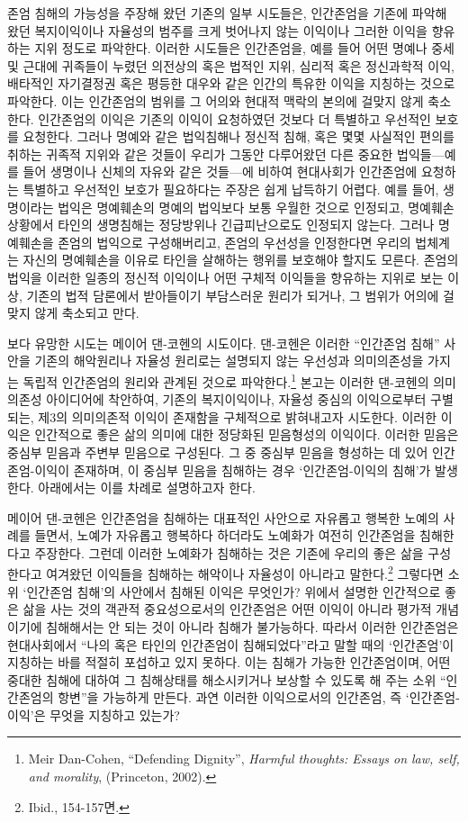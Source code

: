 존엄 침해의 가능성을 주장해 왔던 기존의 일부 시도들은, 인간존엄을 기존에 파악해 왔던 복지이익이나 자율성의 범주를 크게 벗어나지 않는 이익이나 그러한 이익을 향유하는 지위 정도로 파악한다. 이러한 시도들은 인간존엄을, 예를 들어 어떤 명예나 중세 및 근대에 귀족들이 누렸던 의전상의 혹은 법적인 지위, 심리적 혹은 정신과학적 이익, 배타적인 자기결정권 혹은 평등한 대우와 같은 인간의 특유한 이익을 지칭하는 것으로 파악한다. 이는 인간존엄의 범위를 그 어의와 현대적 맥락의 본의에 걸맞지 않게 축소한다. 인간존엄의 이익은 기존의 이익이 요청하였던 것보다 더 특별하고 우선적인 보호를 요청한다. 그러나 명예와 같은 법익침해나 정신적 침해, 혹은 몇몇 사실적인 편의를 취하는 귀족적 지위와 같은 것들이 우리가 그동안 다루어왔던 다른 중요한 법익들---예를 들어 생명이나 신체의 자유와 같은 것들---에 비하여 현대사회가 인간존엄에 요청하는 특별하고 우선적인 보호가 필요하다는 주장은 쉽게 납득하기 어렵다. 예를 들어, 생명이라는 법익은 명예훼손의 명예의 법익보다 보통 우월한 것으로 인정되고, 명예훼손 상황에서 타인의 생명침해는 정당방위나 긴급피난으로도 인정되지 않는다. 그러나 명예훼손을 존엄의 법익으로 구성해버리고, 존엄의 우선성을 인정한다면 우리의 법체계는 자신의 명예훼손을 이유로 타인을 살해하는 행위를 보호해야 할지도 모른다. 존엄의 법익을 이러한 일종의 정신적 이익이나 어떤 구체적 이익들을 향유하는 지위로 보는 이상, 기존의 법적 담론에서 받아들이기 부담스러운 원리가 되거나, 그 범위가 어의에 걸맞지 않게 축소되고 만다.

보다 유망한 시도는 메이어 댄-코헨의 시도이다. 댄-코헨은 이러한 ``인간존엄 침해'' 사안을 기존의 해악원리나 자율성 원리로는 설명되지 않는 우선성과 의미의존성을 가지는 독립적 인간존엄의 원리와 관계된 것으로 파악한다.\footnote{Meir Dan-Cohen, ``Defending Dignity'', \emph{Harmful thoughts: Essays on law, self, and morality}, (Princeton, 2002).} 본고는 이러한 댄-코헨의 의미의존성 아이디어에 착안하여, 기존의 복지이익이나, 자율성 중심의 이익으로부터 구별되는, 제3의 의미의존적 이익이 존재함을 구체적으로 밝혀내고자 시도한다. 이러한 이익은 인간적으로 좋은 삶의 의미에 대한 정당화된 믿음형성의 이익이다. 이러한 믿음은 중심부 믿음과 주변부 믿음으로 구성된다. 그 중 중심부 믿음을 형성하는 데 있어 인간존엄-이익이 존재하며, 이 중심부 믿음을 침해하는 경우 `인간존엄-이익의 침해'가 발생한다. 아래에서는 이를 차례로 설명하고자 한다.

메이어 댄-코헨은 인간존엄을 침해하는 대표적인 사안으로 자유롭고 행복한 노예의 사례를 들면서, 노예가 자유롭고 행복하다 하더라도 노예화가 여전히 인간존엄을 침해한다고 주장한다. 그런데 이러한 노예화가 침해하는 것은 기존에 우리의 좋은 삶을 구성한다고 여겨왔던 이익들을 침해하는 해악이나 자율성이 아니라고 말한다.\footnote{Ibid., 154-157면.} 그렇다면 소위 `인간존엄 침해'의 사안에서 침해된 이익은 무엇인가? 위에서 설명한 인간적으로 좋은 삶을 사는 것의 객관적 중요성으로서의 인간존엄은 어떤 이익이 아니라 평가적 개념이기에 침해해서는 안 되는 것이 아니라 침해가 불가능하다. 따라서 이러한 인간존엄은 현대사회에서 ``나의 혹은 타인의 인간존엄이 침해되었다''라고 말할 때의 `인간존엄'이 지칭하는 바를 적절히 포섭하고 있지 못하다. 이는 침해가 가능한 인간존엄이며, 어떤 중대한 침해에 대하여 그 침해상태를 해소시키거나 보상할 수 있도록 해 주는 소위 ``인간존엄의 항변''을 가능하게 만든다. 과연 이러한 이익으로서의 인간존엄, 즉 `인간존엄-이익'은 무엇을 지칭하고 있는가?

